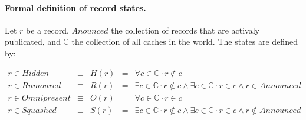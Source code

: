 \documentclass[twoside,english, a4paper]{article}
\renewcommand{\setminus}{\mathrel{\backslash}}
\begin{document}




\paragraph{Formal definition of record states.} Let $r$ be a record, $Anounced$ the 
collection of records that are activaly publicated, and $\mathbb{C}$
the collection of all caches in the world. The states are defined by:

\begin{displaymath}
\begin{array}{lllll}
       r\in Hidden      & \equiv & H(r) &=& \forall c \in \mathbb{C} \cdot r \not \in c \\
       r\in Rumoured    & \equiv & R(r) &=& \exists c \in \mathbb{C} \cdot r \not \in c \wedge \exists c \in \mathbb{C} \cdot r\in c \wedge r\in Announced\\
       r\in Omnipresent & \equiv & O(r) &=& \forall c \in \mathbb{C} \cdot r \in c \\
       r\in Squashed    & \equiv & S(r) &=& \exists c \in \mathbb{C} \cdot r \not \in c \wedge \exists c \in \mathbb{C} \cdot r \in c \wedge r \notin Announced \\
\end{array}
\end{displaymath}
\end{document}
